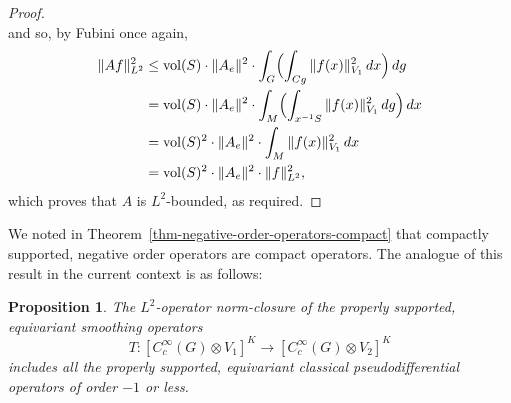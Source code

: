 \documentclass[leqno,11pt]{amsart}
\numberwithin{equation}{subsection}
\theoremstyle{plain}
\newtheorem{proposition}[equation]{Proposition}
\theoremstyle{definition}
\theoremstyle{remark}
\begin{document}
\begin{proof}
\[\]
and so,  by Fubini  once again,
\[
\begin{aligned}
\| A f\|_{L^2}^2  
    & \le  \operatorname{vol}(S)\cdot  \| A_e\|^2 \cdot 
    \int _G \Bigl (\int_{Cg}   \|f(x)  \|_{V_1} ^2 \, dx  \Bigr ) \, dg \\
    & = \operatorname{vol}(S)\cdot \| A_e\|^2  \cdot 
    \int _M \Bigl (\int_{x^{-1}S}   \|f(x)  \|_{V_1} ^2 \, dg \Bigr )   \, dx \\
    & = \operatorname{vol}(S)^2\cdot \| A_e\|^2  \cdot 
    \int _M    \|f(x)  \|_{V_1} ^2     \, dx
    \\
    & = \operatorname{vol}(S)^2 \cdot \| A_e\|^2 \cdot  \| f\|_{L^2}^2,
\end{aligned}
\]
which proves that $A$ is $L^2$-bounded, as required.
\end{proof} 

We noted in Theorem~\ref{thm-negative-order-operators-compact} that compactly supported,  negative order operators  are compact operators.  The analogue of this result in the current context is as follows: 
 

\begin{proposition}
\label{prop-order-minus-one-is-compact}
    The $L^2$-operator norm-closure of the properly supported, equivariant smoothing operators 
    \[
    T \colon [C_c^\infty ( G)\otimes V_1]^K  \longrightarrow [C_c^\infty ( G)\otimes V_2]^K 
    \]
    includes all the properly supported, equivariant classical pseudodifferential  operators of order $-1$ or less.
\end{proposition}
\end{document}
